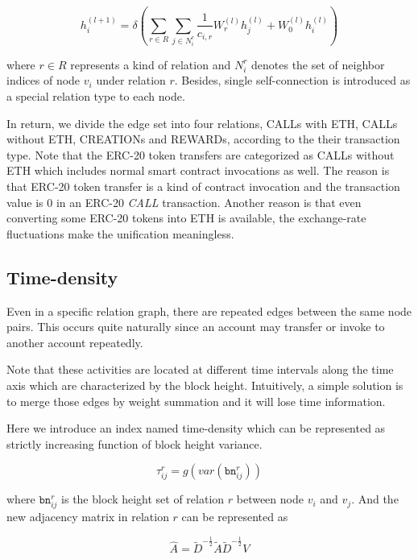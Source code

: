 \begin{equation}
h_i^{(l+1)}=\delta(\sum_{r\in R} \sum_{j \in N_i^r} \frac{1}{c_{i,r}}W_r^{(l)}h_j^{(l)}+W_0^{(l)}h_i^{(l)})
\label{eq:rgcn}
\end{equation}

where $r \in R$ represents a kind of relation and $N_i^r$ denotes the set of neighbor indices of node $v_i$ under relation $r$. Besides, single self-connection is introduced as a special relation type to each node. %

In return, we divide the edge set into four relations, CALLs with ETH, CALLs without ETH, CREATIONs and REWARDs, according to the their transaction type. Note that the ERC-20 token transfers are categorized as CALLs without ETH which includes normal smart contract invocations as well. The reason is that ERC-20 token transfer is a kind of contract invocation and the transaction value is $0$ in an ERC-20 \emph{CALL} transaction. Another reason is that even converting some ERC-20 tokens into ETH is available, the exchange-rate fluctuations make the unification meaningless.


\subsection{Time-density}
Even in a specific relation graph, there are repeated edges between the same node pairs. This occurs quite naturally since an account may transfer or invoke to another account repeatedly.

Note that these activities are located at different time intervals along the time axis which are characterized by the block height. Intuitively, a simple solution is to merge those edges by weight summation and it will lose time information. 

Here we introduce an index named time-density which can be represented as strictly increasing function of block height variance.

\begin{equation}
\tau_{ij}^r=g(var(\texttt{bn}_{ij}^r))
\label{eq:time}
\end{equation}

where $\texttt{bn}_{ij}^{r}$ is the block height set of relation $r$ between node $v_i$ and $v_j$. And the new adjacency matrix in relation $r$ can be represented as 

\begin{equation}
\hat{A}=\tilde{D}^{-\frac{1}{2}}\tilde{A}\tilde{D}^{-\frac{1}{2}}V
\label{eq:?}
\end{equation}

